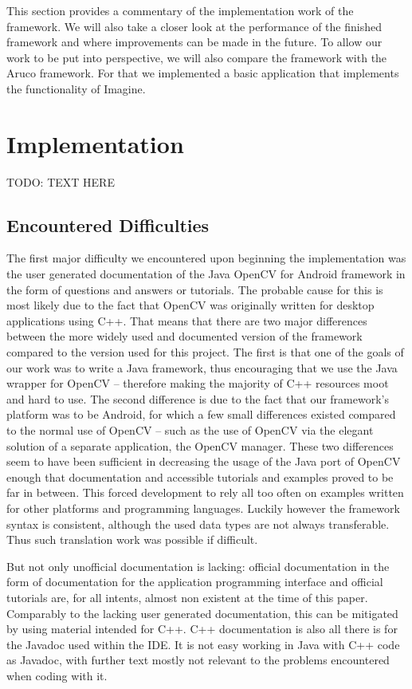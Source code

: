This section provides a commentary of the implementation work of the framework.
We will also take a closer look at the performance of the finished framework and where improvements can be made in the future.
To allow our work to be put into perspective, we will also compare the framework with the Aruco framework.
For that we implemented a basic application that implements the functionality of Imagine.

\section{Implementation}
\label{implementation}

TODO: TEXT HERE

\subsection{Encountered Difficulties}

The first major difficulty we encountered upon beginning the implementation was the user generated documentation of the Java OpenCV for Android framework in the form of questions and answers or tutorials.
The probable cause for this is most likely due to the fact that OpenCV was originally written for desktop applications using C++.
That means that there are two major differences between the more widely used and documented version of the framework compared to the version used for this project.
The first is that one of the goals of our work was to write a Java framework, thus encouraging that we use the Java wrapper for OpenCV – therefore making the majority of C++ resources moot and hard to use.
The second difference is due to the fact that our framework's platform was to be Android, for which a few small differences existed compared to the normal use of OpenCV – such as the use of OpenCV via the elegant solution of a separate application, the OpenCV manager.
These two differences seem to have been sufficient in decreasing the usage of the Java port of OpenCV enough that documentation and accessible tutorials and examples proved to be far in between.
This forced development to rely all too often on examples written for other platforms and programming languages.
Luckily however the framework syntax is consistent, although the used data types are not always transferable.
Thus such translation work was possible if difficult.

But not only unofficial documentation is lacking: official documentation in the form of documentation for the application programming interface and official tutorials are, for all intents, almost non existent at the time of this paper.
Comparably to the lacking user generated documentation, this can be mitigated by using material intended for C++.
C++ documentation is also all there is for the Javadoc used within the IDE.
It is not easy working in Java with C++ code as Javadoc, with further text mostly not relevant to the problems encountered when coding with it.

